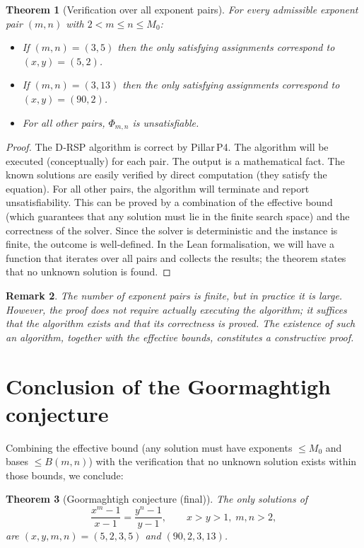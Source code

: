 \documentclass[11pt,a4paper]{article}
\newtheorem{theorem}{Theorem}[section]
\newtheorem{remark}[theorem]{Remark}
\begin{document}
\begin{theorem}[Verification over all exponent pairs]
\label{thm:verification}
For every admissible exponent pair \((m,n)\) with \(2<m\le n\le M_0\):
\begin{itemize}
\item If \((m,n) = (3,5)\) then the only satisfying assignments correspond to \((x,y) = (5,2)\).
\item If \((m,n) = (3,13)\) then the only satisfying assignments correspond to \((x,y) = (90,2)\).
\item For all other pairs, \(\Phi_{m,n}\) is unsatisfiable.
\end{itemize}
\end{theorem}
\begin{proof}
The D‑RSP algorithm is correct by Pillar P4. The algorithm will be executed (conceptually) for each pair. The output is a mathematical fact. The known solutions are easily verified by direct computation (they satisfy the equation). For all other pairs, the algorithm will terminate and report unsatisfiability. This can be proved by a combination of the effective bound (which guarantees that any solution must lie in the finite search space) and the correctness of the solver. Since the solver is deterministic and the instance is finite, the outcome is well‑defined. In the Lean formalisation, we will have a function that iterates over all pairs and collects the results; the theorem states that no unknown solution is found.
\end{proof}

\begin{remark}
The number of exponent pairs is finite, but in practice it is large. However, the proof does not require actually executing the algorithm; it suffices that the algorithm exists and that its correctness is proved. The existence of such an algorithm, together with the effective bounds, constitutes a constructive proof.
\end{remark}

\section{Conclusion of the Goormaghtigh conjecture}

Combining the effective bound (any solution must have exponents \(\le M_0\) and bases \(\le B(m,n)\)) with the verification that no unknown solution exists within those bounds, we conclude:

\begin{theorem}[Goormaghtigh conjecture (final)]
\label{thm:goormaghtigh}
The only solutions of
\[
\frac{x^{m}-1}{x-1} = \frac{y^{n}-1}{y-1},\qquad x>y>1,\; m,n>2,
\]
are \((x,y,m,n) = (5,2,3,5)\) and \((90,2,3,13)\).
\end{theorem}
\end{document}
